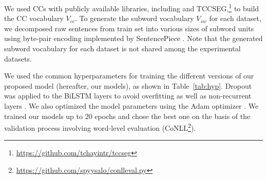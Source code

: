 We used CCs with publicly available libraries, including  and TCCSEG,\footnote{\url{https://github.com/tchayintr/tccseg}} to build the CC vocabulary $V_{cc}$.
%
To generate the subword vocabulary $V_{sw}$ for each dataset, we decomposed raw sentences from train set  into various sizes of subword units using byte-pair encoding \cite{sennrich-etal-2016-neural} implemented by SentencePiece \cite{kudo-richardson-2018-sentencepiece}. Note that the generated subword vocabulary for each dataset is not shared among the experimental datasets.

%
We used the common hyperparameters for training the different versions of our proposed model (hereafter, our models), as shown in Table~\ref{tab:hyp}.
%
Dropout \cite{Srivastava2014} was applied to the BiLSTM layers to avoid overfitting as well as non-recurrent layers \cite{Zaremba2015}.
%
We also optimized the model parameters using the Adam optimizer \cite{Kingma2015}.
%
We trained our models up to 20 epochs and chose the best one on the basis of the validation process involving word-level evaluation (CoNLL\footnote{\url{https://github.com/spyysalo/conlleval.py}}).
%

